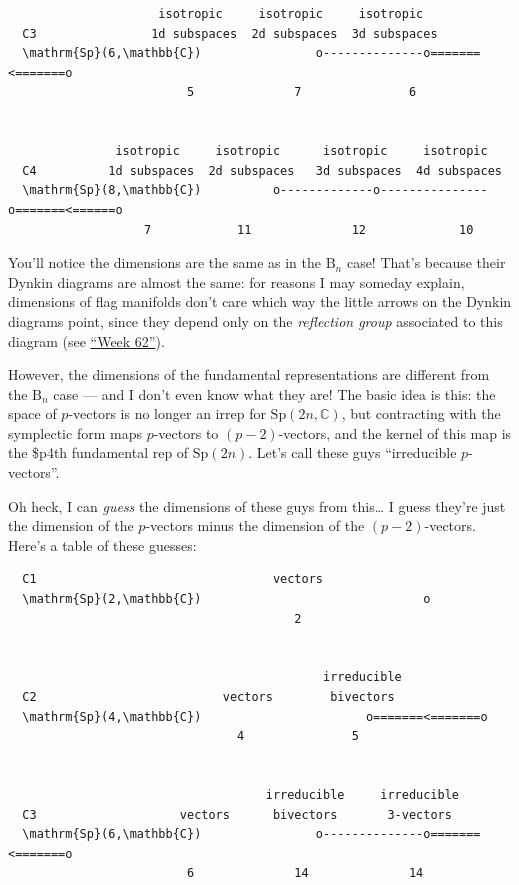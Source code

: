 \documentclass{article}
\begin{document}
\begin{itemize}
\begin{verbatim}
                     isotropic     isotropic     isotropic
  C3                1d subspaces  2d subspaces  3d subspaces
  \mathrm{Sp}(6,\mathbb{C})                o--------------o=======<=======o
                         5              7               6


               isotropic     isotropic      isotropic     isotropic
  C4          1d subspaces  2d subspaces   3d subspaces  4d subspaces
  \mathrm{Sp}(8,\mathbb{C})          o-------------o---------------o=======<======o
                   7            11              12             10 
\end{verbatim}

  You'll notice the dimensions are the same as in the \(\mathrm{B}_n\)
  case! That's because their Dynkin diagrams are almost the same: for
  reasons I may someday explain, dimensions of flag manifolds don't care
  which way the little arrows on the Dynkin diagrams point, since they
  depend only on the \emph{reflection group} associated to this diagram
  (see \protect\hyperlink{week62}{``Week 62''}).

  However, the dimensions of the fundamental representations are
  different from the \(\mathrm{B}_n\) case --- and I don't even know
  what they are! The basic idea is this: the space of \(p\)-vectors is
  no longer an irrep for \(\mathrm{Sp}(2n,\mathbb{C})\), but contracting
  with the symplectic form maps \(p\)-vectors to \((p-2)\)-vectors, and
  the kernel of this map is the \$p4th fundamental rep of
  \(\mathrm{Sp}(2n)\). Let's call these guys ``irreducible
  \(p\)-vectors''.

  Oh heck, I can \emph{guess} the dimensions of these guys from
  this\ldots{} I guess they're just the dimension of the \(p\)-vectors
  minus the dimension of the \((p-2)\)-vectors. Here's a table of these
  guesses:

\begin{verbatim}
  C1                                 vectors
  \mathrm{Sp}(2,\mathbb{C})                               o
                                        2


                                            irreducible 
  C2                          vectors        bivectors
  \mathrm{Sp}(4,\mathbb{C})                       o=======<=======o
                                4               5


                                    irreducible     irreducible
  C3                    vectors      bivectors       3-vectors
  \mathrm{Sp}(6,\mathbb{C})                o--------------o=======<=======o
                         6              14              14



\end{verbatim}
\end{itemize}
\end{document}
